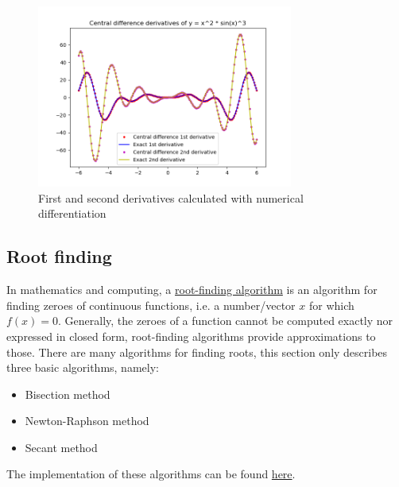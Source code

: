 \begin{figure}[H]
    \centering
    \includegraphics[width=0.75\textwidth]{figure/derivative.png}
    \caption{First and second derivatives calculated with numerical differentiation}
    \label{fig:nume_deriv}
\end{figure}



\subsection{Root finding}
In mathematics and computing, a \href{https://en.wikipedia.org/wiki/Root-finding_algorithms}{root-finding algorithm} is an algorithm for finding zeroes of continuous functions, i.e. a number/vector $x$ for which $f(x) = 0$. Generally, the zeroes of a function cannot be computed exactly nor expressed in closed form, root-finding algorithms provide approximations to those. There are many algorithms for finding roots, this section only describes three basic algorithms, namely:
\begin{itemize}
	\setlength\itemsep{0em}
	\item Bisection method
	\item Newton-Raphson method
	\item Secant method
\end{itemize}
The implementation of these algorithms can be found \href{https://github.com/chitn/quantfin_study/blob/master/root_finding.py}{here}.



